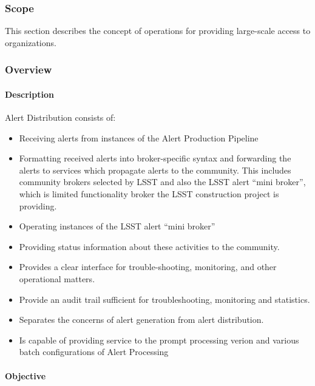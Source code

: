 ﻿\subsubsection{Scope}
This section describes the concept of operations for providing large-scale access to organizations.

\subsubsection{Overview}

\paragraph{Description}

Alert Distribution consists of:
\begin{itemize}

\item Receiving alerts from instances of the Alert Production Pipeline

\item Formatting received alerts into broker-specific syntax and forwarding the alerts to services which propagate alerts to the community. This includes  community brokers selected by LSST and also  the LSST alert “mini broker”, which is limited functionality broker the LSST construction project is providing.  

\item Operating instances of the LSST alert “mini broker”

\item Providing status information about these activities to the community.

\item Provides a clear interface for trouble-shooting, monitoring, and other operational matters.

\item Provide an audit trail sufficient for troubleshooting, monitoring and statistics.

\item Separates the concerns of alert generation from alert distribution.

\item Is capable of providing service to  the prompt processing verion and various batch configurations of Alert Processing 

\end{itemize}

\paragraph{Objective}

